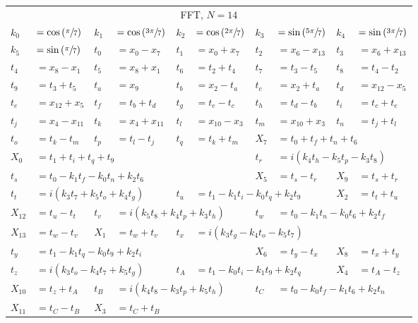 \begin{tabular}{|p{4.3pt}l|p{4.3pt}l|p{4.3pt}l|p{4.3pt}l|p{4.3pt}l|}\toprule \multicolumn{10}{|c|}{FFT, $N=14$} \\
$k_0 $ &$= \cos\left(\sfrac{\pi}{7}\right)$ & $k_1 $ &$= \cos\left(\sfrac{3\pi}{7}\right)$ & $k_2 $ &$= \cos\left(\sfrac{2\pi}{7}\right)$ & $k_3 $ &$= \sin\left(\sfrac{5\pi}{7}\right)$ & $k_4 $ &$= \sin\left(\sfrac{3\pi}{7}\right)$\\ 
$k_5 $ &$= \sin\left(\sfrac{\pi}{7}\right)$ & $t_0 $ &$= x_0 - x_7$ & $t_1 $ &$= x_0 + x_7$ & $t_2 $ &$= x_6 - x_{13}$ & $t_3 $ &$= x_6 + x_{13}$\\ 
$t_4 $ &$= x_8 - x_1$ & $t_5 $ &$= x_8 + x_1$ & $t_6 $ &$= t_2 + t_4$ & $t_7 $ &$= t_3 - t_5$ & $t_8 $ &$= t_4 - t_2$\\ 
$t_9 $ &$= t_3 + t_5$ & $t_a $ &$= x_9$ & $t_b $ &$= x_2 - t_a$ & $t_c $ &$= x_2 + t_a$ & $t_d $ &$= x_{12} - x_5$\\ 
$t_e $ &$= x_{12} + x_5$ & $t_f $ &$= t_b + t_d$ & $t_g $ &$= t_e - t_c$ & $t_h $ &$= t_d - t_b$ & $t_i $ &$= t_c + t_e$\\ 
$t_j $ &$= x_4 - x_{11}$ & $t_k $ &$= x_4 + x_{11}$ & $t_l $ &$= x_{10} - x_3$ & $t_m $ &$= x_{10} + x_3$ & $t_n $ &$= t_j + t_l$\\ 
$t_o $ &$= t_k - t_m$ & $t_p $ &$= t_l - t_j$ & $t_q $ &$= t_k + t_m$ & $X_7 $ &\multicolumn{3}{l|}{$= t_0 + t_f + t_n + t_6$}\\ 
$X_0 $ &\multicolumn{5}{l|}{$= t_1 + t_i + t_q + t_9$} & $t_r $ &\multicolumn{3}{l|}{$= i(k_4t_h - k_5t_p - k_3t_8)$}\\ 
$t_s $ &\multicolumn{5}{l|}{$= t_0 - k_1t_f - k_0t_n + k_2t_6$} & $X_5 $ &$= t_s - t_r$ & $X_9 $ &$= t_s + t_r$\\ 
$t_t $ &\multicolumn{3}{l|}{$= i(k_3t_7 + k_5t_o + k_4t_g)$} & $t_u $ &\multicolumn{3}{l|}{$= t_1 - k_1t_i - k_0t_q + k_2t_9$} & $X_2 $ &$= t_t + t_u$\\ 
$X_{12} $ &$= t_u - t_t$ & $t_v $ &\multicolumn{3}{l|}{$= i(k_5t_8 + k_4t_p + k_3t_h)$} & $t_w $ &\multicolumn{3}{l|}{$= t_0 - k_1t_n - k_0t_6 + k_2t_f$}\\ 
$X_{13} $ &$= t_w - t_v$ & $X_1 $ &$= t_w + t_v$ & $t_x $ &\multicolumn{5}{l|}{$= i(k_3t_g - k_4t_o - k_5t_7)$}\\ 
$t_y $ &\multicolumn{5}{l|}{$= t_1 - k_1t_q - k_0t_9 + k_2t_i$} & $X_6 $ &$= t_y - t_x$ & $X_8 $ &$= t_x + t_y$\\ 
$t_z $ &\multicolumn{3}{l|}{$= i(k_3t_o - k_4t_7 + k_5t_g)$} & $t_A $ &\multicolumn{3}{l|}{$= t_1 - k_0t_i - k_1t_9 + k_2t_q$} & $X_4 $ &$= t_A - t_z$\\ 
$X_{10} $ &$= t_z + t_A$ & $t_B $ &\multicolumn{3}{l|}{$= i(k_4t_8 - k_3t_p + k_5t_h)$} & $t_C $ &\multicolumn{3}{l|}{$= t_0 - k_0t_f - k_1t_6 + k_2t_n$}\\ 
$X_{11} $ &$= t_C - t_B$ & $X_3 $ &\multicolumn{7}{l|}{$= t_C + t_B$}\\ 
\bottomrule\end{tabular}
